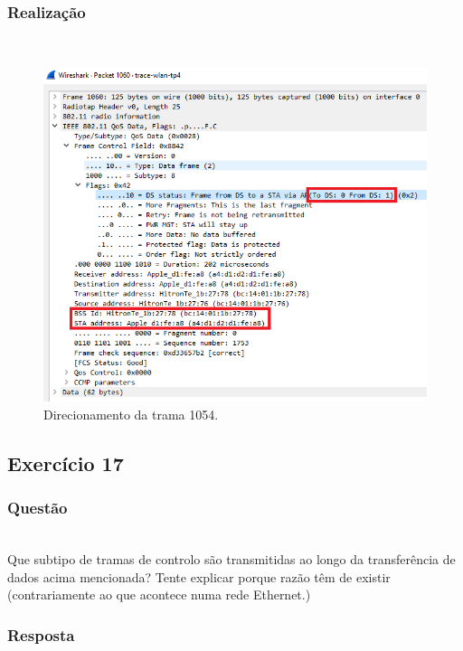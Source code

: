 \documentclass{llncs}
\begin{document}
\subsubsection{Realização}\rule[-10pt]{0pt}{10pt}\\

\begin{figure}
  \begin{center}
  \includegraphics[scale=0.6]{./imagens/p16.png} 
  \end{center}
  \caption{Direcionamento da trama 1054.}
  \label{fig:control_frame}
\end{figure}

\clearpage
\subsection{Exercício 17}
\subsubsection{Questão}\rule[-10pt]{0pt}{10pt}\\

Que subtipo de tramas de controlo são transmitidas ao longo da transferência de dados acima mencionada? Tente explicar porque razão têm de existir (contrariamente ao que acontece numa rede Ethernet.)

\subsubsection{Resposta}\rule[-10pt]{0pt}{10pt}\\
\end{document}
